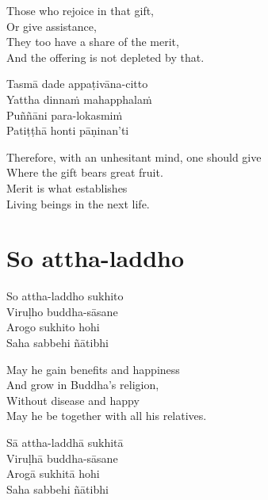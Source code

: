 \begin{english-verses}
  Those who rejoice in that gift,\\
  Or give assistance,\\
  They too have a share of the merit,\\
  And the offering is not depleted by that.
\end{english-verses}

\begin{pali-hang-continued}
  Tasmā dade appaṭivāna-citto\\
  Yattha dinnaṁ mahapphalaṁ\\
  Puññāni para-lokasmiṁ\\
  Patiṭṭhā honti pāṇinan'ti
\end{pali-hang-continued}

\begin{english-verses}
  Therefore, with an unhesitant mind, one should give\\
  Where the gift bears great fruit.\\
  Merit is what establishes\\
  Living beings in the next life.
\end{english-verses}

\suttaRef{[AN 5.36]}

\section{So attha-laddho}
\label{so-attha-laddho}

\vspace{-0.6em}

\begin{twochants}
  So attha-laddho sukhito\\
  Viruḷho buddha-sāsane\\
  Arogo sukhito hohi\\
  Saha sabbehi ñātibhi
\end{twochants}

\begin{english-verses}
  May he gain benefits and happiness\\
  And grow in Buddha's religion,\\
  Without disease and happy\\
  May he be together with all his relatives.
\end{english-verses}

\begin{pali-hang-continued}
  Sā attha-laddhā sukhitā\\
  Viruḷhā buddha-sāsane\\
  Arogā sukhitā hohi\\
  Saha sabbehi ñātibhi
\end{pali-hang-continued}

